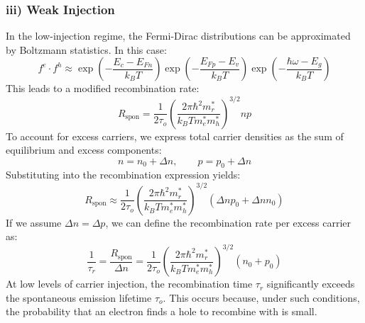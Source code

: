 \subsubsection*{iii) Weak Injection}
In the low-injection regime, the Fermi-Dirac distributions can be approximated by Boltzmann statistics. In this case:
\begin{equation}
	f^e \cdot f^h \approx \exp\left( -\frac{E_c - E_{Fn}}{k_B T} \right)
	\exp\left( -\frac{E_{Fp} - E_v}{k_B T} \right)
	\exp\left( -\frac{\hbar \omega - E_g}{k_B T} \right)
\end{equation}
This leads to a modified recombination rate:
\begin{equation}
	R_{\text{spon}} = \frac{1}{2 \tau_o} \left( \frac{2\pi \hbar^2 m_r^*}{k_B T m_e^* m_h^*} \right)^{3/2} n p
\end{equation}
To account for excess carriers, we express total carrier densities as the sum of equilibrium and excess components:
\begin{equation}
	n = n_0 + \Delta n, \qquad p = p_0 + \Delta n
\end{equation}
Substituting into the recombination expression yields:
\begin{equation}
	R_{\text{spon}} \approx \frac{1}{2 \tau_o} \left( \frac{2\pi \hbar^2 m_r^*}{k_B T m_e^* m_h^*} \right)^{3/2}
	(\Delta n p_0 + \Delta n n_0)
\end{equation}
If we assume \( \Delta n = \Delta p \), we can define the recombination rate per excess carrier as:
\begin{equation}
	\frac{1}{\tau_r} = \frac{R_{\text{spon}}}{\Delta n} = \frac{1}{2 \tau_o}
	\left( \frac{2\pi \hbar^2 m_r^*}{k_B T m_e^* m_h^*} \right)^{3/2}
	(n_0 + p_0)
\end{equation}
At low levels of carrier injection, the recombination time \( \tau_r \) significantly exceeds the spontaneous emission lifetime \( \tau_o \). This occurs because, under such conditions, the probability that an electron finds a hole to recombine with is small.

